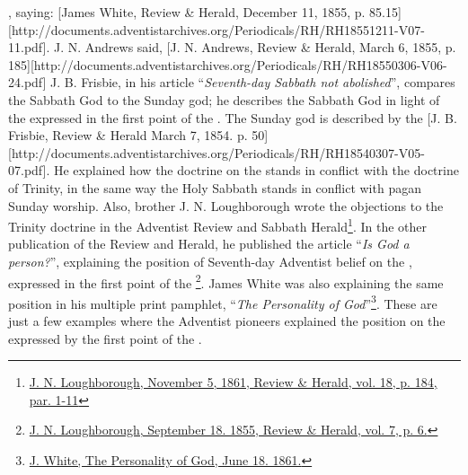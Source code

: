 , saying: [James White, Review \& Herald, December 11, 1855, p. 85.15][http://documents.adventistarchives.org/Periodicals/RH/RH18551211-V07-11.pdf]. J. N. Andrews said, [J. N. Andrews, Review \& Herald, March 6, 1855, p. 185][http://documents.adventistarchives.org/Periodicals/RH/RH18550306-V06-24.pdf] J. B. Frisbie, in his article “\textit{Seventh-day Sabbath not abolished}”, compares the Sabbath God to the Sunday god; he describes the Sabbath God in light of the  expressed in the first point of the . The Sunday god is described by the [J. B. Frisbie, Review \& Herald March 7, 1854. p. 50][http://documents.adventistarchives.org/Periodicals/RH/RH18540307-V05-07.pdf]. He explained how the doctrine on the  stands in conflict with the doctrine of Trinity, in the same way the Holy Sabbath stands in conflict with pagan Sunday worship. Also, brother J. N. Loughborough wrote the objections to the Trinity doctrine in the Adventist Review and Sabbath Herald\footnote{\href{https://adventistdigitallibrary.org/adl-349160/advent-review-and-sabbath-herald-november-5-1861}{J. N. Loughborough, November 5, 1861, Review \& Herald, vol. 18, p. 184, par. 1-11}}. In the other publication of the Review and Herald, he published the article “\textit{Is God a person?}”, explaining the position of Seventh-day Adventist belief on the , expressed in the first point of the \footnote{\href{http://documents.adventistarchives.org/Periodicals/RH/RH18550918-V07-06.pdf}{J. N. Loughborough, September 18. 1855, Review \& Herald, vol. 7, p. 6.}}. James White was also explaining the same position in his multiple print pamphlet, “\textit{The Personality of God}”\footnote{\href{https://egwwritings.org/?ref=en_PERGO.1.1&para=1471.3}{J. White, The Personality of God, June 18. 1861.}}. These are just a few examples where the Adventist pioneers explained the position on the  expressed by the first point of the .


